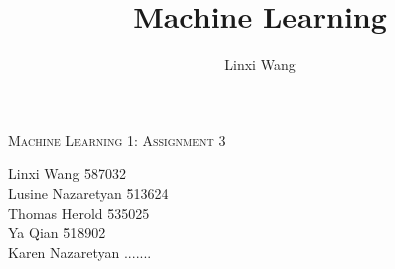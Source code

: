 \documentclass[10pt,a4paper]{article}
\author{Linxi Wang}
\title{Machine Learning}
\begin{document}
\begin{center}
\Large{\textsc{Machine Learning 1: Assignment 3}} \\
\end{center}

\begin{tabbing}
Linxi Wang \hspace{0.9cm}\= 587032\\
Lusine Nazaretyan \hspace{0.9cm}\= 513624\\
Thomas Herold \hspace{0.9cm}\= 535025\\ 
Ya Qian \hspace{0.9cm}\= 518902\\ 
Karen Nazaretyan\>  .......
\end{tabbing}
\end{document}
